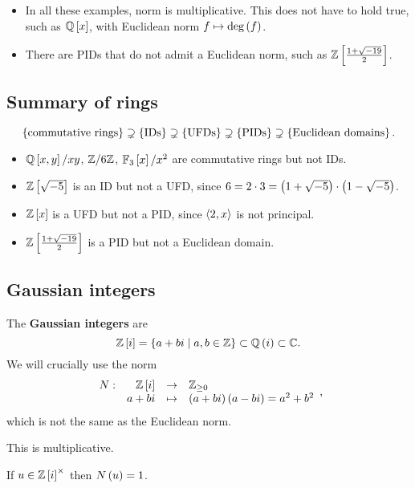 \begin{remark*}
\hfill
\begin{itemize}
\item In all these examples, norm is multiplicative. This does not have to hold true, such as $ \mathbb{Q}\left[ x \right] $, with Euclidean norm $ f \mapsto \deg\left( f \right) $.
\item There are PIDs that do not admit a Euclidean norm, such as $ \mathbb{Z}\left[ \tfrac{1 + \sqrt{-19}}{2} \right] $.
\end{itemize}
\end{remark*}

\subsection{Summary of rings}

$$ \left\{ \text{commutative rings} \right\} \supsetneq \left\{ \text{IDs} \right\} \supsetneq \left\{ \text{UFDs} \right\} \supsetneq \left\{ \text{PIDs} \right\} \supsetneq \left\{ \text{Euclidean domains} \right\}. $$
\begin{itemize}
\item $ \mathbb{Q}\left[ x, y \right] / xy $, $ \mathbb{Z} / 6\mathbb{Z} $, $ \mathbb{F}_3\left[ x \right] / x^2 $ are commutative rings but not IDs.
\item $ \mathbb{Z}\left[ \sqrt{-5} \right] $ is an ID but not a UFD, since $ 6 = 2 \cdot 3 = \left( 1 + \sqrt{-5} \right) \cdot \left( 1 - \sqrt{-5} \right) $.
\item $ \mathbb{Z}\left[ x \right] $ is a UFD but not a PID, since $ \left\langle 2, x \right\rangle $ is not principal.
\item $ \mathbb{Z}\left[ \tfrac{1 + \sqrt{-19}}{2} \right] $ is a PID but not a Euclidean domain.
\end{itemize}

\pagebreak

\subsection{Gaussian integers}

The \textbf{Gaussian integers} are
$$ \mathbb{Z}\left[ i \right] = \left\{ a + bi \mid a, b \in \mathbb{Z} \right\} \subset \mathbb{Q}\left( i \right) \subset \mathbb{C}. $$
We will crucially use the norm
$$ \function[N]{\Z\sb{i}}{\Z_{\ge 0}}{a + bi}{\rb{a + bi}\rb{a - bi} = a^2 + b^2}, $$
which is not the same as the Euclidean norm.

\begin{note*}
This is multiplicative.
\end{note*}

\begin{proposition}
If $ u \in \mathbb{Z}\left[ i \right]^\times $ then $ N\left( u \right) = 1 $.
\end{proposition}

